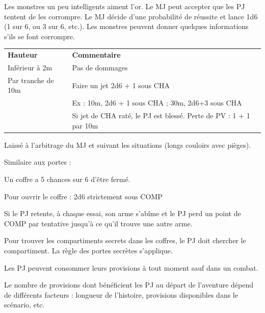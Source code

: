 \begin{frame}[b]
{

Les monstres un peu intelligents aiment l'or. Le MJ peut accepter que les PJ tentent de les corrompre. Le MJ décide d'une probabilité de réussite et lance 1d6 (1 sur 6, ou 3 sur 6, etc.). Les monstres peuvent donner quelques informations s'ils se font corrompre.


\vspace{0.2cm}

\begin{tabular}{lp{5.8cm}}
\textbf{Hauteur} & \textbf{Commentaire} \\
Inférieur à 2m     & Pas de dommages                                                   \\
Par tranche de 10m & Faire un jet 2d6 + 1 sous CHA                                     \\
                   & Ex : 10m, 2d6 + 1 sous CHA ; 30m, 2d6+3 sous CHA                  \\
                   & Si jet de CHA raté, le PJ est blessé. Perte de PV : 1 + 1 par 10m \\
\end{tabular}

\vspace{0.2cm}


Laissé à l'arbitrage du MJ et suivant les situations (longs couloirs avec pièges).


Similaire aux portes :
\begin{myitemize}
\item Un coffre a 5 chances sur 6 d'être fermé.
\item Pour ouvrir le coffre : 2d6 strictement sous COMP
\item Si le PJ retente, à chaque essai, son arme s'abîme et le PJ perd un point de COMP par tentative jusqu'à ce qu'il trouve une autre arme.
\end{myitemize}

Pour trouver les compartiments secrets dans les coffres, le PJ doit chercher le compartiment. La règle des portes secrètes s'applique.


Les PJ peuvent consommer leurs provisions à tout moment sauf dans un combat.

Le nombre de provisions dont bénéficient les PJ au départ de l'aventure dépend de différents facteurs : longueur de l'histoire, provisions disponibles dans le scénario, etc.

}
\end{frame}
